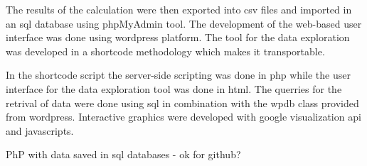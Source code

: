 The results of the calculation were then exported into csv files and imported
in an sql database using phpMyAdmin tool. The development of the web-based user interface was done using wordpress platform. The tool for the data exploration was developed in a shortcode methodology
which makes it transportable.

In the shortcode script the server-side scripting was done in php while the user interface for the data exploration tool was done in html. The querries for the retrival of data were done using sql in combination with the wpdb class provided from wordpress. Interactive graphics were developed with google visualization api and javascripts.

PhP with data saved in sql databases - ok for github?